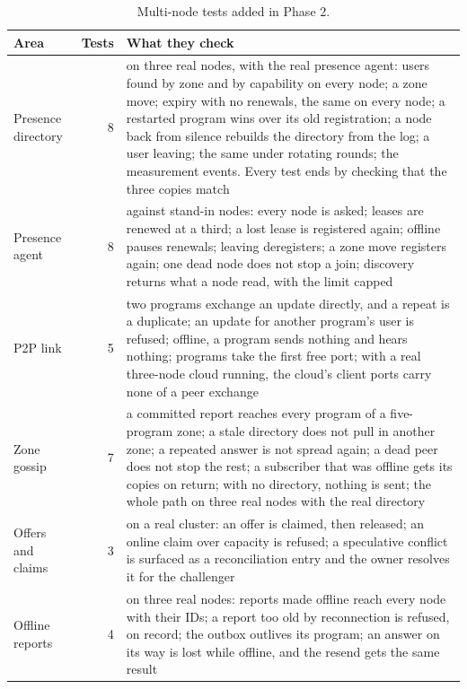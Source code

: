 \begin{table}[!htb]
\centering\small
\caption{Multi-node tests added in Phase 2.}
\label{tab:testfiles}
\begin{tabularx}{\linewidth}{@{}P{3.6cm}rL@{}}
\toprule
Area & Tests & What they check \\
\midrule
Presence directory & 8 & on three real nodes, with the real presence agent: users found by zone and by capability on every node; a zone move; expiry with no renewals, the same on every node; a restarted program wins over its old registration; a node back from silence rebuilds the directory from the log; a user leaving; the same under rotating rounds; the measurement events. Every test ends by checking that the three copies match \\ %
Presence agent & 8 & against stand-in nodes: every node is asked; leases are renewed at a third; a lost lease is registered again; offline pauses renewals; leaving deregisters; a zone move registers again; one dead node does not stop a join; discovery returns what a node read, with the limit capped \\ %
P2P link & 5 & two programs exchange an update directly, and a repeat is a duplicate; an update for another program's user is refused; offline, a program sends nothing and hears nothing; programs take the first free port; with a real three-node cloud running, the cloud's client ports carry none of a peer exchange \\ %
Zone gossip & 7 & a committed report reaches every program of a five-program zone; a stale directory does not pull in another zone; a repeated answer is not spread again; a dead peer does not stop the rest; a subscriber that was offline gets its copies on return; with no directory, nothing is sent; the whole path on three real nodes with the real directory \\ %
Offers and claims & 3 & on a real cluster: an offer is claimed, then released; an online claim over capacity is refused; a speculative conflict is surfaced as a reconciliation entry and the owner resolves it for the challenger \\ %
Offline reports & 4 & on three real nodes: reports made offline reach every node with their IDs; a report too old by reconnection is refused, on record; the outbox outlives its program; an answer on its way is lost while offline, and the resend gets the same result \\ %

\end{tabularx}
\end{table}
